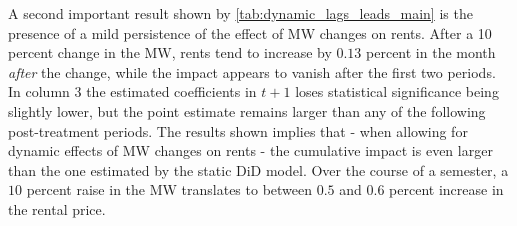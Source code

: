 A second important result shown by \autoref{tab:dynamic_lags_leads_main} is the presence of a mild 
persistence of the effect of MW changes on rents. After a 10 percent change in the MW, rents tend to 
increase by $0.13$ percent in the month \textit{after} the change, while the impact appears to vanish 
after the first two periods. In column 3 the estimated coefficients in $t+1$ loses statistical 
significance being slightly lower, but the point estimate remains larger than any of the following 
post-treatment periods. The results shown implies that - when allowing for dynamic effects of MW 
changes on rents - the cumulative impact is even larger than the one estimated by the static DiD 
model. Over the course of a semester, a $10$ percent raise in the MW translates to between $0.5$ 
and $0.6$ percent increase in the rental price.

